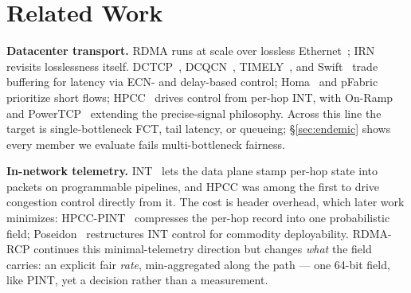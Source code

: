 \documentclass[conference]{IEEEtran}
\newcommand{\hpccfs}{\textsc{RDMA-RCP}\xspace}
\renewcommand{\paragraph}[1]{\par\smallskip\noindent\textbf{#1}\hspace{0.5em}\ignorespaces}
\begin{document}
\section{Related Work}
\label{sec:related}

\paragraph{Datacenter transport.} RDMA runs at scale over lossless
Ethernet~\cite{guo2016rdma}; IRN~\cite{mittal2018irn} revisits losslessness itself.
DCTCP~\cite{alizadeh2010dctcp}, DCQCN~\cite{zhu2015dcqcn},
TIMELY~\cite{mittal2015timely}, and Swift~\cite{kumar2020swift} trade buffering for latency
via ECN- and delay-based control; Homa~\cite{montazeri2018homa} and pFabric~\cite{alizadeh2013pfabric}
prioritize short flows; HPCC~\cite{li2019hpcc} drives control from per-hop INT, with
On-Ramp~\cite{liu2021onramp} and PowerTCP~\cite{addanki2022powertcp} extending the precise-signal
philosophy. Across this line the target is single-bottleneck FCT, tail latency, or queueing;
\S\ref{sec:endemic} shows every member we evaluate fails multi-bottleneck fairness.

\paragraph{In-network telemetry.} INT~\cite{kim2015int} lets the data plane stamp per-hop state into
packets on programmable pipelines, and HPCC was among the first to drive congestion control directly
from it. The cost is header overhead, which later work minimizes: HPCC-PINT~\cite{yang2020pint}
compresses the per-hop record into one probabilistic field; Poseidon~\cite{wang2023poseidon}
restructures INT control for commodity deployability. \hpccfs continues this
minimal-telemetry direction but changes \emph{what} the field carries: an explicit fair
\emph{rate}, min-aggregated along the path --- one 64-bit field, like PINT, yet a decision
rather than a measurement.
\end{document}
